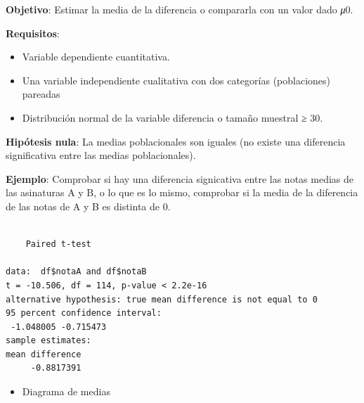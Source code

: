 \documentclass[
  spanish,
  a4paper,
]{scrreport}
\newenvironment{Shaded}{\begin{snugshade}}{\end{snugshade}}
\newcommand{\AttributeTok}[1]{\textcolor[rgb]{0.40,0.45,0.13}{#1}}
\newcommand{\ConstantTok}[1]{\textcolor[rgb]{0.56,0.35,0.01}{#1}}
\newcommand{\FunctionTok}[1]{\textcolor[rgb]{0.28,0.35,0.67}{#1}}
\newcommand{\NormalTok}[1]{\textcolor[rgb]{0.00,0.23,0.31}{#1}}
\newcommand{\SpecialCharTok}[1]{\textcolor[rgb]{0.37,0.37,0.37}{#1}}
\newcommand{\StringTok}[1]{\textcolor[rgb]{0.13,0.47,0.30}{#1}}
\providecommand{\tightlist}{%
  \setlength{\itemsep}{0pt}\setlength{\parskip}{0pt}}
\theoremstyle{definition}
\theoremstyle{definition}
\theoremstyle{remark}
\begin{document}
\textbf{Objetivo}: Estimar la media de la diferencia o compararla con un
valor dado \emph{μ}0.

\textbf{Requisitos}:

\begin{itemize}
\tightlist
\item
  Variable dependiente cuantitativa.
\item
  Una variable independiente cualitativa con dos categorías
  (poblaciones) pareadas
\item
  Distribución normal de la variable diferencia o tamaño muestral ≥ 30.
\end{itemize}

\textbf{Hipótesis nula}: La medias poblacionales son iguales (no existe
una diferencia significativa entre las medias poblacionales).

\textbf{Ejemplo}: Comprobar si hay una diferencia signicativa entre las
notas medias de las asinaturas A y B, o lo que es lo mismo, comprobar si
la media de la diferencia de las notas de A y B es distinta de 0.

\begin{Shaded}
\end{Shaded}

\begin{verbatim}

    Paired t-test

data:  df$notaA and df$notaB
t = -10.506, df = 114, p-value < 2.2e-16
alternative hypothesis: true mean difference is not equal to 0
95 percent confidence interval:
 -1.048005 -0.715473
sample estimates:
mean difference 
     -0.8817391 
\end{verbatim}

\begin{itemize}
\tightlist
\item
  Diagrama de medias
\end{itemize}
\end{document}
